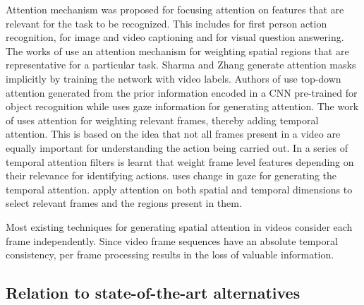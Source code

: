 \documentclass[10pt,twocolumn,letterpaper]{article}
\begin{document}
Attention mechanism was proposed for focusing attention on features that are relevant for the task to be recognized. This includes \cite{sudhakaran2018attention, li2018eye, shen2018egocentric} for first person action recognition, \cite{anderson2018bottom, ma2017attend, wang2018bidirectional} for image and video captioning and \cite{nguyen2018improved, anderson2018bottom, liang2018focal} for visual question answering. The works of \cite{sharma2015action, girdhar2017attentional, sudhakaran2018top, sudhakaran2018attention, attention_eccv18, li2018eye} use an attention mechanism for weighting spatial regions that are representative for a particular task. Sharma \etal \cite{sharma2015action} and Zhang \etal \cite{attention_eccv18} generate attention masks implicitly by training the network with  video labels. 
Authors of \cite{girdhar2017attentional, sudhakaran2018top, sudhakaran2018attention} use top-down attention generated from the prior information encoded in a CNN pre-trained for object recognition while \cite{li2018eye} uses gaze information for generating attention.  The work of \cite{piergiovanni2017learning, shen2018egocentric} uses attention for weighting relevant frames, thereby adding temporal attention. This is based on the idea that not all frames present in a video are equally important for understanding the action being carried out. In \cite{piergiovanni2017learning} a series of temporal attention filters is learnt that weight frame level features depending on their relevance for identifying actions. \cite{shen2018egocentric} uses change in gaze for generating the temporal attention. \cite{li2018videolstm, du2018recurrent} apply attention on both spatial and temporal dimensions to select relevant frames and the regions present in them.

Most existing techniques for generating spatial attention in videos consider each frame independently. 
Since video frame sequences have an absolute temporal consistency, per frame processing results in the loss of valuable information.



\subsection{Relation to state-of-the-art alternatives}
\end{document}
